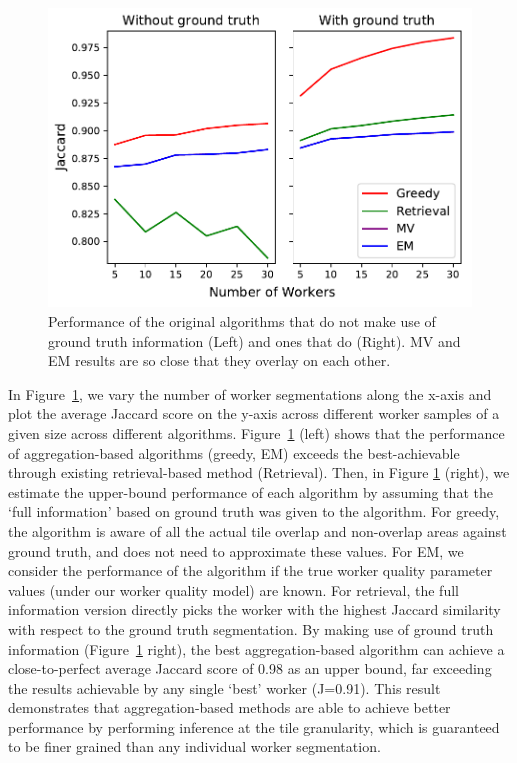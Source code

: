 \begin{figure}[h!]
   \centering
   \includegraphics[trim={0 1pt 4pt 0},clip,width=0.8\linewidth]{plots/Retrieval_vs_Aggregation.pdf}
   \caption{Performance of the original algorithms that do not make use of ground truth information (Left) and ones that do (Right). MV and EM results are so close that they overlay on each other.} %
   \label{retrieval_vs_aggregation}   
   \vspace{-12pt}
   \setlength{\abovecaptionskip}{-30pt}
   \setlength{\belowcaptionskip}{-23pt}
\end{figure} 
\npar In Figure~\ref{retrieval_vs_aggregation}, we vary the number of worker segmentations along the x-axis and plot the average Jaccard score on the y-axis across different worker samples of a given size across different algorithms. Figure~\ref{retrieval_vs_aggregation} (left) shows that the performance of aggregation-based algorithms (greedy, EM) exceeds the best-achievable through existing retrieval-based method (Retrieval). Then, in Figure \ref{retrieval_vs_aggregation} (right), we estimate the upper-bound performance of each algorithm by assuming that the `full information' based on ground truth was given to the algorithm. For greedy, the algorithm is aware of all the actual tile overlap and non-overlap areas against ground truth, and does not need to approximate these values. For EM, we consider the performance of the algorithm if the true worker quality parameter values (under our worker quality model) are known. For retrieval, the full information version directly picks the worker with the highest Jaccard similarity with respect to the ground truth segmentation. By making use of ground truth information (Figure~\ref{retrieval_vs_aggregation} right), the best aggregation-based algorithm can achieve a close-to-perfect average Jaccard score of 0.98 as an upper bound, far exceeding the results achievable by any single `best' worker (J=0.91). This result demonstrates that aggregation-based methods are able to achieve better performance by performing inference at the tile granularity, which is guaranteed to be finer grained than any individual worker segmentation. 

